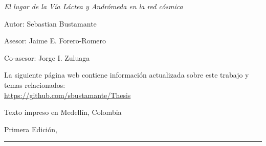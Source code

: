 
\thispagestyle{empty}

\hfill

\vfill

\medskip


\noindent
\textit{
El lugar de la Vía Láctea y Andrómeda en la red cósmica
}




Autor: Sebastian Bustamante

Asesor: Jaime E. Forero-Romero

Co-asesor: Jorge I. Zuluaga



\vfill

\vfill

\noindent
La siguiente página web contiene información actualizada sobre este trabajo y temas relacionados: \\
\url{https://github.com/sbustamante/Thesis}


\noindent
Texto impreso en Medellín, Colombia

\noindent
Primera Edición, 
\monthname \ \the\year

\vspace{1cm}
\hrule
\bigskip

\cleardoublepage

%
%
%
%
%
%

